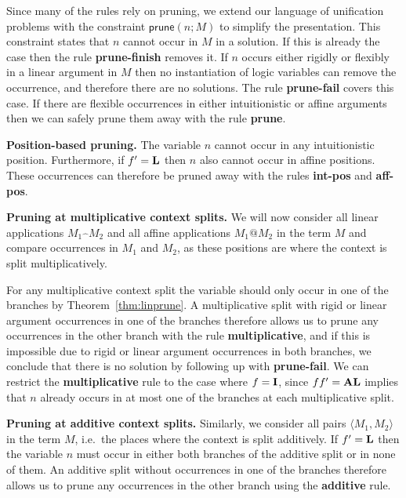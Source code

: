 \documentclass{eptcs}
\makeatletter
\newcommand{\lhat}[1]{\widehat{\;#1\;}}
\newcommand\affapp{{@}}
\newcommand\fI{\textup{$\mathbf{I}$}}
\newcommand\fA{\textup{$\mathbf{A}$}}
\newcommand\fL{\textup{$\mathbf{L}$}}
\theoremstyle{definition}
\makeatother
\begin{document}
Since many of the rules rely on pruning, we extend our language of
unification problems with the constraint $\textsf{prune}(n;M)$ to
simplify the presentation.  This
constraint states that $n$ cannot occur in $M$ in a solution.  If this is
already the case then the rule \textbf{prune-finish} removes it.  If $n$ occurs either rigidly or
flexibly in a linear argument in $M$ then no instantiation of logic
variables can remove the occurrence, and therefore there are no
solutions.  The rule \textbf{prune-fail} covers this case.  If there are
flexible occurrences in either intuitionistic or affine arguments then
we can safely prune them away with the rule \textbf{prune}.

\medskip \noindent\textbf{Position-based pruning.}
The variable $n$ cannot occur in any intuitionistic position.  
Furthermore, if $f'=\fL$ then $n$ also cannot occur in affine positions.
These occurrences can therefore be pruned away with the rules
\textbf{int-pos} and \textbf{aff-pos}.

\medskip \noindent\textbf{Pruning at multiplicative context splits.}
We will now consider all linear applications $M_1\lhat{}M_2$ and all affine
applications $M_1\affapp M_2$
in the term $M$ and compare occurrences in $M_1$ and $M_2$,
as these positions are where the context is split
multiplicatively.

For any multiplicative context split the variable should only occur in one
of the branches by Theorem~\ref{thm:linprune}.  A multiplicative split
with rigid or linear argument
occurrences in one of the branches therefore allows us to prune any
occurrences in the other branch with the rule \textbf{multiplicative},
and if this is impossible due to rigid
or linear argument occurrences in both branches, we conclude that
there is no solution by following up with \textbf{prune-fail}.
We can restrict the \textbf{multiplicative} rule to the case where
$f=\fI$, since $ff'=\fA\fL$ implies that $n$ already occurs in at most
one of the branches at each multiplicative split.

\medskip \noindent\textbf{Pruning at additive context splits.}
Similarly, we consider all pairs $\langle M_1,M_2\rangle$ in the term
$M$, i.e.\ the places where the context is split additively.
If $f'=\fL$ then the variable $n$ must occur in either both
branches of the additive split or in none of them.  An additive split without occurrences in
one of the branches therefore allows us to prune any occurrences in the
other branch using the \textbf{additive} rule.
\end{document}

